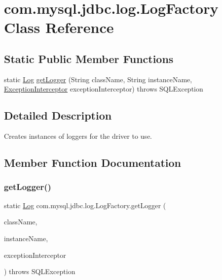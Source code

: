 \hypertarget{classcom_1_1mysql_1_1jdbc_1_1log_1_1_log_factory}{}\section{com.\+mysql.\+jdbc.\+log.\+Log\+Factory Class Reference}
\label{classcom_1_1mysql_1_1jdbc_1_1log_1_1_log_factory}
\subsection*{Static Public Member Functions}
\begin{DoxyCompactItemize}
\item 
static \mbox{\hyperlink{interfacecom_1_1mysql_1_1jdbc_1_1log_1_1_log}{Log}} \mbox{\hyperlink{classcom_1_1mysql_1_1jdbc_1_1log_1_1_log_factory_a3f0b5a4ccece1431779fa4b8c79806b8}{get\+Logger}} (String class\+Name, String instance\+Name, \mbox{\hyperlink{interfacecom_1_1mysql_1_1jdbc_1_1_exception_interceptor}{Exception\+Interceptor}} exception\+Interceptor)  throws S\+Q\+L\+Exception 
\end{DoxyCompactItemize}


\subsection{Detailed Description}
Creates instances of loggers for the driver to use. 

\subsection{Member Function Documentation}
\mbox{\label{classcom_1_1mysql_1_1jdbc_1_1log_1_1_log_factory_a3f0b5a4ccece1431779fa4b8c79806b8}} 
\subsubsection{\texorpdfstring{get\+Logger()}{getLogger()}}
{\footnotesize\ttfamily static \mbox{\hyperlink{interfacecom_1_1mysql_1_1jdbc_1_1log_1_1_log}{Log}} com.\+mysql.\+jdbc.\+log.\+Log\+Factory.\+get\+Logger (\begin{DoxyParamCaption}\item[{String}]{class\+Name,  }\item[{String}]{instance\+Name,  }\item[{\mbox{\hyperlink{interfacecom_1_1mysql_1_1jdbc_1_1_exception_interceptor}{Exception\+Interceptor}}}]{exception\+Interceptor }\end{DoxyParamCaption}) throws S\+Q\+L\+Exception\hspace{0.3cm}{\ttfamily [static]}}

